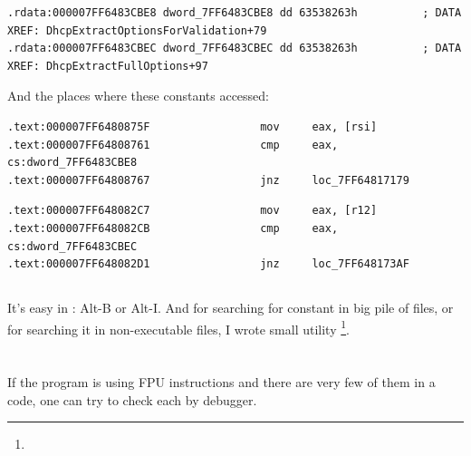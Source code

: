 \begin{lstlisting}[caption=dhcpcore.dll (Windows 7 x64)]
.rdata:000007FF6483CBE8 dword_7FF6483CBE8 dd 63538263h          ; DATA XREF: DhcpExtractOptionsForValidation+79
.rdata:000007FF6483CBEC dword_7FF6483CBEC dd 63538263h          ; DATA XREF: DhcpExtractFullOptions+97
\end{lstlisting}

{And the places where these constants accessed:}

\begin{lstlisting}[caption=dhcpcore.dll (Windows 7 x64)]
.text:000007FF6480875F                 mov     eax, [rsi]
.text:000007FF64808761                 cmp     eax, cs:dword_7FF6483CBE8
.text:000007FF64808767                 jnz     loc_7FF64817179
\end{lstlisting}


\begin{lstlisting}[caption=dhcpcore.dll (Windows 7 x64)]
.text:000007FF648082C7                 mov     eax, [r12]
.text:000007FF648082CB                 cmp     eax, cs:dword_7FF6483CBEC
.text:000007FF648082D1                 jnz     loc_7FF648173AF
\end{lstlisting}

\subsection{}

{It's easy in \IDA: Alt-B or Alt-I.}
{And for searching for constant in big pile of files, or for searching it in non-executable files,
I wrote small utility}
\footnote{\BGREPURL}.

\section{}

{If the program is using FPU instructions and there are very few of them in a code,
one can try to check each by debugger.}

